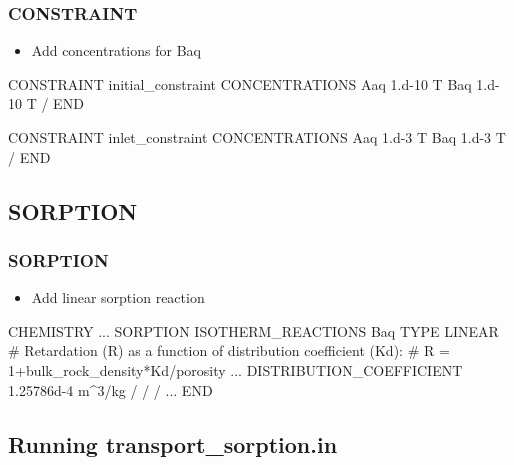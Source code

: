 \documentclass{beamer}
\newcommand\bluecomment[1]{{{\color{blue} #1}}}
\newcommand\magentacomment[1]{{{\color{magenta} #1}}}
\begin{document}
\begin{frame}[fragile]\frametitle{CONSTRAINT}

\begin{itemize}
  \item Add concentrations for Baq
\end{itemize}

\begin{semiverbatim}

CONSTRAINT initial_constraint
  CONCENTRATIONS
    Aaq   1.d-10   T
    \magentacomment{Baq   1.d-10   T}
  /
END

CONSTRAINT inlet_constraint
  CONCENTRATIONS
    Aaq   1.d-3    T
    \magentacomment{Baq   1.d-3    T}
  /
END

\end{semiverbatim}

\end{frame}

\subsection{SORPTION}

\begin{frame}\frametitle{SORPTION}

\begin{itemize}
  \item Add linear sorption reaction
\end{itemize}

\begin{semiverbatim}
CHEMISTRY
  ...
  \magentacomment{SORPTION}
    \magentacomment{ISOTHERM_REACTIONS}
      \magentacomment{Baq}
        \magentacomment{TYPE LINEAR}
        \bluecomment{# Retardation (R) as a function of distribution coefficient (Kd):}
        \bluecomment{#   R = 1+bulk_rock_density*Kd/porosity}
        ...
        \magentacomment{DISTRIBUTION_COEFFICIENT 1.25786d-4 m^3/kg}
      \magentacomment{/}
    \magentacomment{/}
  \magentacomment{/}
  ...
END
\end{semiverbatim}

\end{frame}

\subsection{Running transport\_sorption.in}
\end{document}
